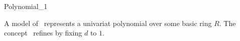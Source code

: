 \begin{ccRefConcept}{Polynomial_1}

\ccDefinition

A model of \ccRefName\ represents a univariat polynomial over some basic ring 
$R$. The concept \ccRefName\ refines  by fixing $d$ to $1$.

\ccRefines

\\

\ccSeeAlso 

\\
\\
\\

\ccHasModels

\end{ccRefConcept}